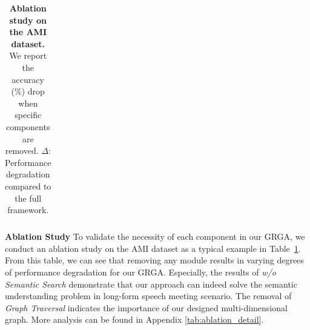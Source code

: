 \documentclass[11pt]{article}
\begin{document}
\begin{table}[t]
{\begin{tabular}{l | c c | c c c c c}
            \bottomrule
        \end{tabular}%
    }
    \caption{\textbf{Ablation study on the AMI dataset.} We report the accuracy (\%) drop when specific components are removed. \textbf{$\Delta$}: Performance degradation compared to the full framework. }
    \label{tab:ablation}
\end{table}
\textbf{Ablation Study}
To validate the necessity of each component in our GRGA, we conduct an ablation study on the AMI dataset as a typical example in Table~\ref{tab:ablation}. From this table, we can see that removing any module results in varying degrees of performance degradation for our GRGA. Especially, the results of \textit{w/o Semantic Search} demonstrate that our approach can indeed solve the semantic understanding problem in long-form speech meeting scenario. The removal of \textit{Graph Traversal} indicates the importance of our designed multi-dimensional graph. More analysis can be found in Appendix \ref{tab:ablation_detail}.


\end{document}
